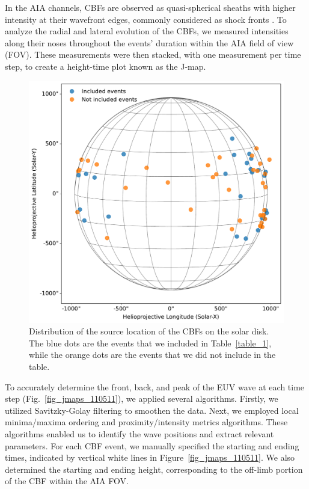 In the AIA channels, CBFs are observed as quasi-spherical sheaths with higher intensity at their wavefront edges, commonly considered as shock fronts \citep{vourlidas_2003, ontiveros_2009, kozarev_2011, ma_2011}. To analyze the radial and lateral evolution of the CBFs, we measured intensities along their noses throughout the events' duration within the AIA field of view (FOV). These measurements were then stacked, with one measurement per time step, to create a height-time plot known as the J-map.

\begin{figure}[!htp] %
	\centerline{\includegraphics[width=0.7\columnwidth]{chapter2/figs/events_coords.pdf}}
	\caption{Distribution of the source location of the CBFs on the solar disk. The blue dots are the events that we included in Table~\ref{table_1}, while the orange dots are the events that we did not include in the table.}
	\label{fig_solardisk}
\end{figure}

To accurately determine the front, back, and peak of the EUV wave at each time step (Fig.~\ref{fig_jmaps_110511}), we applied several algorithms. Firstly, we utilized Savitzky-Golay filtering \citep{savitzky_1964} to smoothen the data. Next, we employed local minima/maxima ordering and proximity/intensity metrics algorithms. These algorithms enabled us to identify the wave positions and extract relevant parameters.
For each CBF event, we manually specified the starting and ending times, indicated by vertical white lines in Figure~\ref{fig_jmaps_110511}. We also determined the starting and ending height, corresponding to the off-limb portion of the CBF within the AIA FOV.

